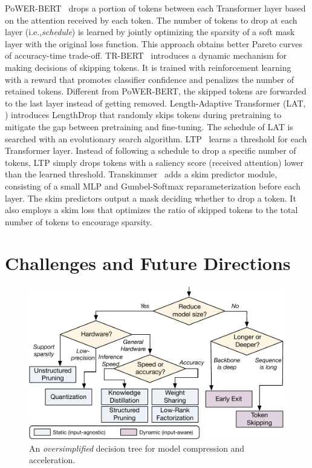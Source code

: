 \documentclass[letterpaper]{article} %
\newcommand{\ie}{i.e.,\xspace}
\begin{document}
PoWER-BERT~\citep{powerbert} drops a portion of tokens between each Transformer layer based on the attention received by each token. The number of tokens to drop at each layer (\ie \textit{schedule}) is learned by jointly optimizing the sparsity of a soft mask layer with the original loss function. This approach obtains better Pareto curves of accuracy-time trade-off. TR-BERT~\citep{trbert} introduces a dynamic mechanism for making decisions of skipping tokens. It is trained with reinforcement learning with a reward that promotes classifier confidence and penalizes the number of retained tokens. Different from PoWER-BERT, the skipped tokens are forwarded to the last layer instead of getting removed. Length-Adaptive Transformer (LAT, \citealp{lat}) introduces LengthDrop that randomly skips tokens during pretraining to mitigate the gap between pretraining and fine-tuning. The schedule of LAT is searched with an evolutionary search algorithm. LTP~\citep{ltp} learns a threshold for each Transformer layer. Instead of following a schedule to drop a specific number of tokens, LTP simply drops tokens with a saliency score (received attention) lower than the learned threshold. Transkimmer~\citep{transkimmer} adds a skim predictor module, consisting of a small MLP and Gumbel-Softmax reparameterization before each layer. The skim predictors output a mask deciding whether to drop a token. It also employs a skim loss that optimizes the ratio of skipped tokens to the total number of tokens to encourage sparsity.

\section{Challenges and Future Directions}
\begin{figure}[t]
\centering
  \includegraphics[width=\linewidth]{decision_tree.pdf}
  \caption{An \textit{oversimplified} decision tree for model compression and acceleration.}
  \label{fig:decision}
\end{figure}
\end{document}

